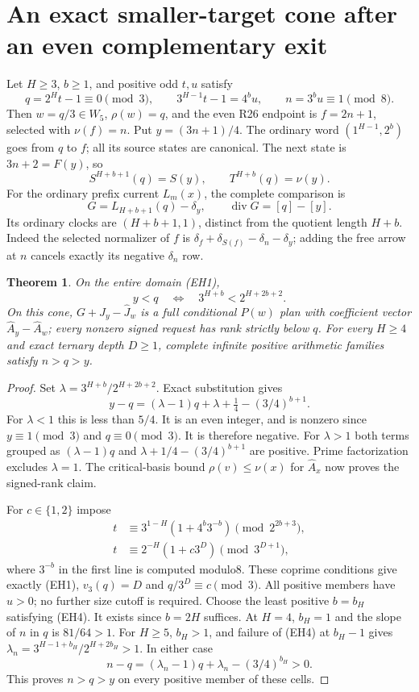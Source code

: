 \documentclass[11pt]{article}
\newtheorem{theorem}{Theorem}
\begin{document}
\section{An exact smaller-target cone after an even complementary exit}
Let $H\ge3$, $b\ge1$, and positive odd $t,u$ satisfy
\[
 q=2^Ht-1\equiv0\pmod3,\qquad
 3^{H-1}t-1=4^bu,\qquad n=3^bu\equiv1\pmod8.
 \tag{EH1}
\]
Then $w=q/3\in W_5$, $\rho(w)=q$, and the even R26 endpoint is
$f=2n+1$, selected with $\nu(f)=n$. Put $y=(3n+1)/4$.
The ordinary word $(1^{H-1},2^b)$ goes from $q$ to $f$;
all its source states are canonical. The next state is
$3n+2=F(y)$, so
\[
 S^{H+b+1}(q)=S(y),\qquad T^{H+b}(q)=\nu(y).
 \tag{EH2}
\]
For the ordinary prefix current $L_m(x)$, the complete comparison is
\[
 G=L_{H+b+1}(q)-\delta_y,\qquad
 \operatorname{div}G=[q]-[y].
 \tag{EH3}
\]
Its ordinary clocks are $(H+b+1,1)$, distinct from the quotient length
$H+b$. Indeed the selected normalizer of $f$ is
$\delta_f+\delta_{S(f)}-\delta_n-\delta_y$; adding the free arrow
at $n$ cancels exactly its negative $\delta_n$ row.

\begin{theorem}\label{thm:evenexithistory}
On the entire domain (EH1),
\[
 y<q\quad\Longleftrightarrow\quad
 3^{H+b}<2^{H+2b+2}.
 \tag{EH4}
\]
On this cone, $G+\widehat J_y-\widehat J_w$ is a full conditional
$P(w)$ plan with coefficient vector $\widehat A_y-\widehat A_w$;
every nonzero signed request has rank strictly below $q$.
For every $H\ge4$ and exact ternary depth $D\ge1$, complete infinite
positive arithmetic families satisfy $n>q>y$.
\end{theorem}
\begin{proof}
Set $\lambda=3^{H+b}/2^{H+2b+2}$. Exact substitution gives
\[
 y-q=(\lambda-1)q+\lambda+\tfrac14-(3/4)^{b+1}.
 \tag{EH5}
\]
For $\lambda<1$ this is less than $5/4$. It is an even integer,
and is nonzero since $y\equiv1\pmod3$ and $q\equiv0\pmod3$.
It is therefore negative. For $\lambda>1$ both terms grouped as
$(\lambda-1)q$ and $\lambda+1/4-(3/4)^{b+1}$ are positive.
Prime factorization excludes $\lambda=1$. The critical-basis bound
$\rho(v)\le\nu(x)$ for $\widehat A_x$ now proves the signed-rank claim.

For $c\in\{1,2\}$ impose
\[
\begin{split}
 t&\equiv3^{1-H}(1+4^b3^{-b})\pmod{2^{2b+3}},\\
 t&\equiv2^{-H}(1+c3^D)\pmod{3^{D+1}},
\end{split}
 \tag{EH6}
\]
where $3^{-b}$ in the first line is computed modulo8. These coprime
conditions give exactly (EH1), $v_3(q)=D$ and $q/3^D\equiv c\pmod3$.
All positive members have $u>0$; no further size cutoff is required.
Choose the least positive $b=b_H$ satisfying (EH4). It exists since
$b=2H$ suffices. At $H=4$, $b_H=1$ and the slope of $n$ in $q$ is
$81/64>1$. For $H\ge5$, $b_H>1$, and failure of (EH4) at $b_H-1$
gives $\lambda_n=3^{H-1+b_H}/2^{H+2b_H}>1$. In either case
\[
 n-q=(\lambda_n-1)q+\lambda_n-(3/4)^{b_H}>0.
\]
This proves $n>q>y$ on every positive member of these cells.
\end{proof}
\end{document}
